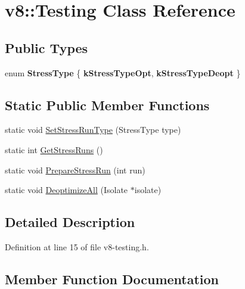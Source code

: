 \hypertarget{classv8_1_1Testing}{}\section{v8\+:\+:Testing Class Reference}
\label{classv8_1_1Testing}
\subsection*{Public Types}
\begin{DoxyCompactItemize}
\item 
\mbox{\label{classv8_1_1Testing_a436a1a521a0bc070cc0b46ad7a658575}} 
enum {\bfseries Stress\+Type} \{ {\bfseries k\+Stress\+Type\+Opt}, 
{\bfseries k\+Stress\+Type\+Deopt}
 \}
\end{DoxyCompactItemize}
\subsection*{Static Public Member Functions}
\begin{DoxyCompactItemize}
\item 
static void \mbox{\hyperlink{classv8_1_1Testing_aafa5a4917998aa64134aa750ce5c4b2e}{Set\+Stress\+Run\+Type}} (Stress\+Type type)
\item 
static int \mbox{\hyperlink{classv8_1_1Testing_adc876063b1e07462b8d9544dd8efab36}{Get\+Stress\+Runs}} ()
\item 
static void \mbox{\hyperlink{classv8_1_1Testing_ab9da044b18b9d05770b655bed27ed7f4}{Prepare\+Stress\+Run}} (int run)
\item 
static void \mbox{\hyperlink{classv8_1_1Testing_ac0881a3cee2f8f91039d3ecdb15dbf27}{Deoptimize\+All}} (Isolate $\ast$isolate)
\end{DoxyCompactItemize}


\subsection{Detailed Description}


Definition at line 15 of file v8-\/testing.\+h.



\subsection{Member Function Documentation}
\mbox{\label{classv8_1_1Testing_ac0881a3cee2f8f91039d3ecdb15dbf27}} 
